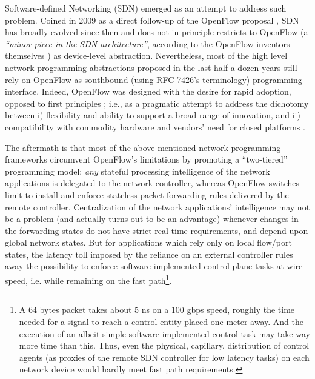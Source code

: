 \documentclass{sig-alternate}
\begin{document}
Software-defined Networking (SDN) emerged as an attempt to address such problem. Coined in 2009 \cite{Gre09} as a direct follow-up of the OpenFlow proposal \cite{OF08}, SDN has broadly evolved since then \cite{frz14} and does not in principle restricts to OpenFlow (a {\em ``minor piece in the SDN architecture''}, according to the OpenFlow inventors themselves \cite{She11}) as device-level abstraction. Nevertheless, most of the high level network programming abstractions proposed in the last half a dozen years \cite{Gud08,Nay09,Fos11,Voe12,Mon13,Nel14,Kim15} still rely on OpenFlow as southbound (using RFC 7426's terminology) programming interface. Indeed, OpenFlow was designed with the desire for rapid adoption, opposed to first principles \cite{frz14}; i.e., as a pragmatic attempt to address the dichotomy between i) flexibility and ability to support a broad range of innovation, and ii) compatibility with commodity hardware and vendors' need for closed platforms \cite{OF08}. 

The aftermath is that most of the above mentioned network programming frameworks circumvent OpenFlow's limitations by promoting a ``two-tiered'' \cite{Ara15} programming model: {\em any} stateful processing intelligence of the network applications is delegated to the network controller, whereas OpenFlow switches limit to install and enforce stateless packet forwarding rules delivered by the remote controller. Centralization of the network applications' intelligence may not be a problem (and actually turns out to be an advantage) whenever changes in the forwarding states do not have strict real time requirements, and depend upon global network states. But for applications which rely only on local flow/port states, the latency toll imposed by the reliance on an external controller rules away the possibility to enforce software-implemented control plane tasks at wire speed, i.e. while remaining on the fast path\footnote{
A 64 bytes packet takes about 5 ns on a 100 gbps speed, roughly the time needed for a signal to reach a control entity placed one meter away. And the execution of an albeit simple software-implemented control task may take way more time than this. Thus, even the physical, capillary, distribution of control agents (as proxies of the remote SDN controller for low latency tasks) on each network device would hardly meet fast path requirements. }. 
\end{document}
